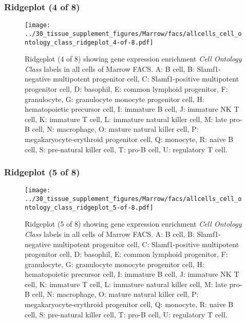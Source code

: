 \subsubsection{Ridgeplot (4 of 8)}
\begin{figure}[h]
\centering
\texttt{[image: ../30\_tissue\_supplement\_figures/Marrow/facs/allcells\_cell\_ontology\_class\_ridgeplot\_4-of-8.pdf]}

\caption{ Ridgeplot (4 of 8)  showing gene expression enrichment \emph{Cell Ontology Class} labels in all cells of Marrow FACS. A: B cell, B: Slamf1-negative multipotent progenitor cell, C: Slamf1-positive multipotent progenitor cell, D: basophil, E: common lymphoid progenitor, F: granulocyte, G: granulocyte monocyte progenitor cell, H: hematopoietic precursor cell, I: immature B cell, J: immature NK T cell, K: immature T cell, L: immature natural killer cell, M: late pro-B cell, N: macrophage, O: mature natural killer cell, P: megakaryocyte-erythroid progenitor cell, Q: monocyte, R: naive B cell, S: pre-natural killer cell, T: pro-B cell, U: regulatory T cell.}
\end{figure}


\clearpage

\subsubsection{Ridgeplot (5 of 8)}
\begin{figure}[h]
\centering
\texttt{[image: ../30\_tissue\_supplement\_figures/Marrow/facs/allcells\_cell\_ontology\_class\_ridgeplot\_5-of-8.pdf]}

\caption{ Ridgeplot (5 of 8)  showing gene expression enrichment \emph{Cell Ontology Class} labels in all cells of Marrow FACS. A: B cell, B: Slamf1-negative multipotent progenitor cell, C: Slamf1-positive multipotent progenitor cell, D: basophil, E: common lymphoid progenitor, F: granulocyte, G: granulocyte monocyte progenitor cell, H: hematopoietic precursor cell, I: immature B cell, J: immature NK T cell, K: immature T cell, L: immature natural killer cell, M: late pro-B cell, N: macrophage, O: mature natural killer cell, P: megakaryocyte-erythroid progenitor cell, Q: monocyte, R: naive B cell, S: pre-natural killer cell, T: pro-B cell, U: regulatory T cell.}
\end{figure}


\clearpage

